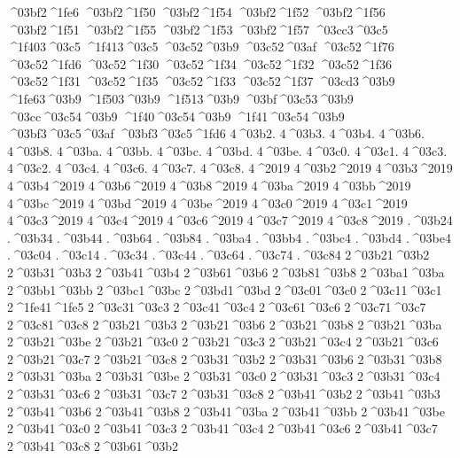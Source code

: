 {^^^^03bf2^^^^1fe6
^^^^03bf2^^^^1f50
^^^^03bf2^^^^1f54
^^^^03bf2^^^^1f52
^^^^03bf2^^^^1f56
^^^^03bf2^^^^1f51
^^^^03bf2^^^^1f55
^^^^03bf2^^^^1f53
^^^^03bf2^^^^1f57
^^^^03cc3^^^^03c5
^^^^1f403^^^^03c5
^^^^1f413^^^^03c5
^^^^03c52^^^^03b9
^^^^03c52^^^^03af
^^^^03c52^^^^1f76
^^^^03c52^^^^1fd6
^^^^03c52^^^^1f30
^^^^03c52^^^^1f34
^^^^03c52^^^^1f32
^^^^03c52^^^^1f36
^^^^03c52^^^^1f31
^^^^03c52^^^^1f35
^^^^03c52^^^^1f33
^^^^03c52^^^^1f37
^^^^03cd3^^^^03b9
^^^^1fe63^^^^03b9
^^^^1f503^^^^03b9
^^^^1f513^^^^03b9
^^^^03bf^^^^03c53^^^^03b9
^^^^03cc^^^^03c54^^^^03b9
^^^^1f40^^^^03c54^^^^03b9
^^^^1f41^^^^03c54^^^^03b9
^^^^03bf3^^^^03c5^^^^03af
^^^^03bf3^^^^03c5^^^^1fd6
4^^^^03b2.
4^^^^03b3.
4^^^^03b4.
4^^^^03b6.
4^^^^03b8.
4^^^^03ba.
4^^^^03bb.
4^^^^03bc.
4^^^^03bd.
4^^^^03be.
4^^^^03c0.
4^^^^03c1.
4^^^^03c3.
4^^^^03c2.
4^^^^03c4.
4^^^^03c6.
4^^^^03c7.
4^^^^03c8.
4^^^^2019
4^^^^03b2^^^^2019
4^^^^03b3^^^^2019
4^^^^03b4^^^^2019
4^^^^03b6^^^^2019
4^^^^03b8^^^^2019
4^^^^03ba^^^^2019
4^^^^03bb^^^^2019
4^^^^03bc^^^^2019
4^^^^03bd^^^^2019
4^^^^03be^^^^2019
4^^^^03c0^^^^2019
4^^^^03c1^^^^2019
4^^^^03c3^^^^2019
4^^^^03c4^^^^2019
4^^^^03c6^^^^2019
4^^^^03c7^^^^2019
4^^^^03c8^^^^2019
.^^^^03b24
.^^^^03b34
.^^^^03b44
.^^^^03b64
.^^^^03b84
.^^^^03ba4
.^^^^03bb4
.^^^^03bc4
.^^^^03bd4
.^^^^03be4
.^^^^03c04
.^^^^03c14
.^^^^03c34
.^^^^03c44
.^^^^03c64
.^^^^03c74
.^^^^03c84
2^^^^03b21^^^^03b2
2^^^^03b31^^^^03b3
2^^^^03b41^^^^03b4
2^^^^03b61^^^^03b6
2^^^^03b81^^^^03b8
2^^^^03ba1^^^^03ba
2^^^^03bb1^^^^03bb
2^^^^03bc1^^^^03bc
2^^^^03bd1^^^^03bd
2^^^^03c01^^^^03c0
2^^^^03c11^^^^03c1
2^^^^1fe41^^^^1fe5
2^^^^03c31^^^^03c3
2^^^^03c41^^^^03c4
2^^^^03c61^^^^03c6
2^^^^03c71^^^^03c7
2^^^^03c81^^^^03c8
2^^^^03b21^^^^03b3
2^^^^03b21^^^^03b6
2^^^^03b21^^^^03b8
2^^^^03b21^^^^03ba
2^^^^03b21^^^^03be
2^^^^03b21^^^^03c0
2^^^^03b21^^^^03c3
2^^^^03b21^^^^03c4
2^^^^03b21^^^^03c6
2^^^^03b21^^^^03c7
2^^^^03b21^^^^03c8
%
2^^^^03b31^^^^03b2
2^^^^03b31^^^^03b6
2^^^^03b31^^^^03b8
2^^^^03b31^^^^03ba
2^^^^03b31^^^^03be
2^^^^03b31^^^^03c0
2^^^^03b31^^^^03c3
2^^^^03b31^^^^03c4
2^^^^03b31^^^^03c6
2^^^^03b31^^^^03c7
2^^^^03b31^^^^03c8
%
2^^^^03b41^^^^03b2
2^^^^03b41^^^^03b3
2^^^^03b41^^^^03b6
2^^^^03b41^^^^03b8
2^^^^03b41^^^^03ba
2^^^^03b41^^^^03bb
2^^^^03b41^^^^03be
2^^^^03b41^^^^03c0
2^^^^03b41^^^^03c3
2^^^^03b41^^^^03c4
2^^^^03b41^^^^03c6
2^^^^03b41^^^^03c7
2^^^^03b41^^^^03c8
%
2^^^^03b61^^^^03b2 %
}
